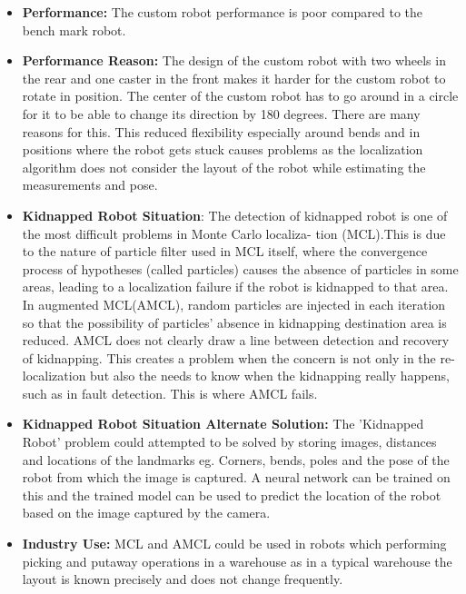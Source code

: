 \documentclass[10pt,journal,compsoc]{IEEEtran}
\begin{document}
\begin{itemize}
\item \textbf{Performance:} The custom robot performance is poor compared to the bench mark robot.
\item \textbf{Performance Reason:} The design of the custom robot with two wheels in the rear and one caster in the front makes it harder for the custom robot to rotate in position. The center of the custom robot has to go around in a circle for it to be able to change its direction by 180 degrees. There are many reasons for this.  This reduced flexibility especially around bends and in positions where the robot gets stuck causes problems as the localization algorithm does not consider the layout of the robot while estimating the measurements and pose.  

\item \textbf{Kidnapped Robot Situation}: The detection of kidnapped robot is
one of the most difficult problems in Monte Carlo localiza-
tion (MCL).This is due to the nature of particle filter used in MCL itself, where the convergence  process of hypotheses (called particles) causes the absence of particles in some areas, leading to a localization failure if the robot is kidnapped to that area\cite{kidnap}.
In augmented MCL(AMCL)\cite{amclpaper}, random particles are injected in
each iteration so that the possibility of particles’ absence in kidnapping destination area is reduced. 
AMCL does not clearly draw a line between detection and recovery of kidnapping. This creates a problem when the concern is not only in the re-localization but also the needs to know when the kidnapping really happens, such as in fault detection. This is where AMCL fails\cite{kidnap}.

\item \textbf{Kidnapped Robot Situation Alternate Solution:} The 'Kidnapped Robot' problem could attempted to be solved by storing images, distances and locations of the landmarks eg. Corners, bends, poles and the pose of the robot from which the image is captured. A neural network can be trained on this and the trained model can be used to predict the location of the robot based on the image captured by the camera.
\item \textbf{ Industry Use:} MCL and AMCL could be used in robots which performing picking and putaway operations in a warehouse as in a typical warehouse the layout is known precisely and does not change frequently.

\end {itemize}
\end{document}
